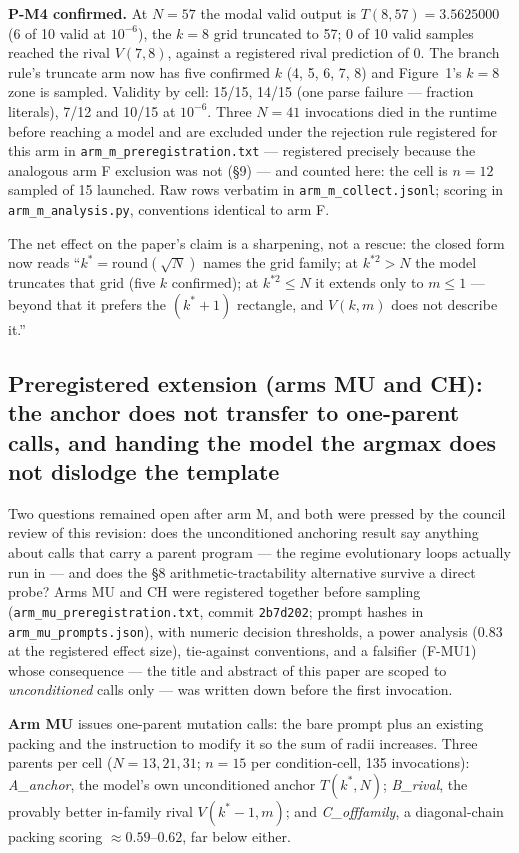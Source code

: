 \documentclass[11pt]{article}
\begin{document}
\textbf{P-M4 confirmed.} At $N = 57$ the modal valid output is $T(8,57) = 3.5625000$ (6 of 10 valid at
$10^{-6}$), the $k = 8$ grid truncated to 57; 0 of 10 valid samples reached the rival $V(7,8)$, against
a registered rival prediction of 0. The branch rule's truncate arm now has five confirmed $k$
(4, 5, 6, 7, 8) and Figure~1's $k = 8$ zone is sampled. Validity by cell: 15/15, 14/15
(one parse failure --- fraction literals), 7/12 and 10/15 at $10^{-6}$. Three $N = 41$ invocations
died in the runtime before reaching a model and are excluded under the rejection rule
registered for this arm in \texttt{arm\_m\_preregistration.txt} --- registered precisely because
the analogous arm F exclusion was not (\S9) --- and counted here: the cell is $n = 12$ sampled
of 15 launched. Raw rows verbatim in
\texttt{arm\_m\_collect.jsonl}; scoring in \texttt{arm\_m\_analysis.py}, conventions identical to arm F.

The net effect on the paper's claim is a sharpening, not a rescue: the closed form now reads
``$k^{*} = \mathrm{round}(\sqrt{N})$ names the grid family; at $k^{*2} > N$ the model truncates that grid (five $k$
confirmed); at $k^{*2} \le N$ it extends only to $m \le 1$ --- beyond that it prefers the $(k^{*}+1)$
rectangle, and $V(k, m)$ does not describe it.''

\subsection{Preregistered extension (arms MU and CH): the anchor does not transfer to one-parent calls, and handing the model the argmax does not dislodge the template}

Two questions remained open after arm M, and both were pressed by the council review of this
revision: does the unconditioned anchoring result say anything about calls that carry a parent
program --- the regime evolutionary loops actually run in --- and does the \S8
arithmetic-tractability alternative survive a direct probe? Arms MU and CH were registered
together before sampling (\texttt{arm\_mu\_preregistration.txt}, commit \texttt{2b7d202};
prompt hashes in \texttt{arm\_mu\_prompts.json}), with numeric decision thresholds, a power
analysis (0.83 at the registered effect size), tie-against conventions, and a falsifier
(F-MU1) whose consequence --- the title and abstract of this paper are scoped to
\textit{unconditioned} calls only --- was written down before the first invocation.

\textbf{Arm MU} issues one-parent mutation calls: the bare prompt plus an existing packing and
the instruction to modify it so the sum of radii increases. Three parents per cell
($N = 13, 21, 31$; $n = 15$ per condition-cell, 135 invocations): \textit{A\_anchor}, the
model's own unconditioned anchor $T(k^{*}, N)$; \textit{B\_rival}, the provably better
in-family rival $V(k^{*}-1, m)$; and \textit{C\_offfamily}, a diagonal-chain packing scoring
$\approx 0.59$--$0.62$, far below either.
\end{document}
